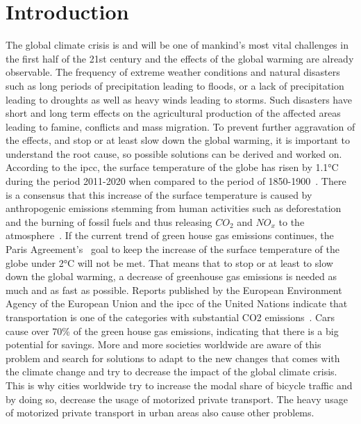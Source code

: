 \cleardoublepage
\chapter{Introduction}
\label{cha:introduction}
The global climate crisis is and will be one of mankind's most vital challenges in the first half of the 21st century and the effects of the global warming are already observable.
The frequency of extreme weather conditions and natural disasters such as long periods of precipitation leading to floods, or a lack of precipitation leading to droughts as well as heavy winds leading to storms.
Such disasters have short and long term effects on the agricultural production of the affected areas leading to famine, conflicts and mass migration.
To prevent further aggravation of the effects, and stop or at least slow down the global warming, it is important to understand the root cause, so possible solutions can be derived and worked on. 
According to the \ac{ipcc}, the surface temperature of the globe has risen by 1.1°C during the period 2011-2020 when compared to the period of 1850-1900~\cite{lee2023climate}.
There is a consensus that this increase of the surface temperature is caused by anthropogenic emissions stemming from human activities such as deforestation and the burning of fossil fuels and thus releasing $CO_{2}$ and $NO_{x}$ to the atmosphere~\cite{archer2010climate}.
If the current trend of green house gas emissions continues, the Paris Agreement's~\cite{un2015paris} goal to keep the increase of the surface temperature of the globe under 2°C will not be met\cite{noah2023data}.
That means that to stop or at least to slow down the global warming, a decrease of greenhouse gas emissions is needed as much and as fast as possible.
Reports published by the European Environment Agency of the European Union and the \ac{ipcc} of the United Nations indicate that transportation is one of the categories with substantial CO2 emissions~\cite{lee2023climate2}.
Cars cause over 70\% of the green house gas emissions, indicating that there is a big potential for savings.
More and more societies worldwide are aware of this problem and search for solutions to adapt to the new changes that comes with the climate change and try to decrease the impact of the global climate crisis.
This is why cities worldwide try to increase the modal share of bicycle traffic and by doing so, decrease the usage of motorized private transport.
The heavy usage of motorized private transport in urban areas also cause other problems.


